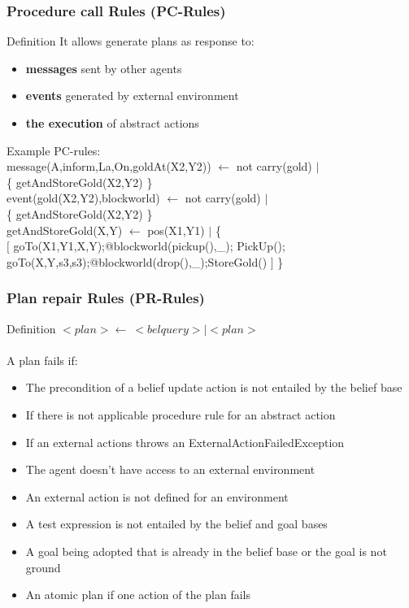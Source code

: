 \documentclass{beamer}
\newcommand\tab[1][1cm]{\hspace*{#1}}
\begin{document}
\begin{frame}
\frametitle{Procedure call Rules (PC-Rules)}
	\begin{block}{Definition}
    	It allows generate plans as response to:
        \begin{itemize}
            \item \textbf{messages} sent by other agents 
            \item \textbf{events} generated by external environment 
            \item \textbf{the execution} of abstract actions
        \end{itemize}
    \end{block}
    
    \begin{block}{Example}
    	PC-rules:\\
  		\tab message(A,inform,La,On,goldAt(X2,Y2)) $\leftarrow$  not carry(gold) $|$\\
        \tab \tab \tab \{ getAndStoreGold(X2,Y2) \}\\
        \tab event(gold(X2,Y2),blockworld) $\leftarrow$  not carry(gold) $|$\\
    	\tab \tab \tab \{ getAndStoreGold(X2,Y2) \}\\ 
        \tab getAndStoreGold(X,Y) $\leftarrow$ pos(X1,Y1) $|$ \{ \\
    	\tab \tab  $[$ goTo(X1,Y1,X,Y);@blockworld(pickup(),\_); PickUp(); \\
        \tab \tab  goTo(X,Y,s3,s3);@blockworld(drop(),\_);StoreGold() $]$ \} 
    \end{block}
\end{frame}
\begin{frame}
\frametitle{Plan repair Rules (PR-Rules)}
  \begin{block}{Definition}
	$<plan>\leftarrow\ <belquery> | <plan> $ \\~\\
    A plan fails if:
   	\begin{itemize}
   	 	\item The precondition of a belief update action is not entailed by the belief base
   	 	\item If there is not applicable procedure rule for an abstract action
        \item If an external actions throws an ExternalActionFailedException
        \item The agent doesn't have access to an external environment 
        \item An external action is not defined for an environment
        \item A test expression is not entailed by the belief and goal bases
        \item A goal being adopted that is already in the belief base or the goal is not ground
        \item An atomic plan if one action of the plan fails
   	\end{itemize} 
  \end{block}
\end{frame}
\end{document}
